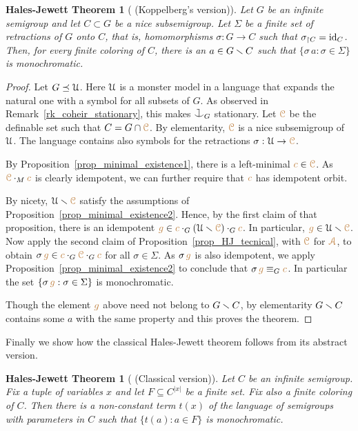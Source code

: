 \theoremstyle{mio}
\newtheorem{HalesJewett}[thm]{Hales-Jewett Theorem}
\begin{HalesJewett}[ (Koppelberg's version)]\label{thm_abstract_HJ}
Let $G$ be an infinite semigroup and let $C\subset G$ be a nice subsemigroup.
Let $\Sigma$ be a finite set of retractions of $G$ onto $C$, that is, 
homomorphisms $\sigma:G\to C$ such that $\sigma_{\restriction C}={\rm id}_C$.
Then, for every finite coloring of $C$,
there is an $a\in G\smallsetminus C$ such that $\{\sigma\,a:\sigma\in\Sigma\}$ is monochromatic.
\end{HalesJewett}

\begin{proof}
Let $G\preceq\EuScript U$.
Here $\EuScript U$ is a monster model in a language that expands the natural one with a symbol for all subsets of $G$.
As observed in Remark~\ref{rk_coheir_stationary}, 
this makes $\cnonfork_G$ stationary.
Let ${\color{brown}\EuScript C}$ be the definable set such that $C=G\cap{\color{brown}\EuScript C}$.
By elementarity, ${\color{brown}\EuScript C}$ is a nice subsemigroup of $\EuScript U$.
The language contains also symbols for 
the retractions $\sigma:\EuScript U\to{\color{brown}\EuScript C}$.

By Proposition~\ref{prop_minimal_existence1}, there is a left-minimal ${\color{brown} c}\in{\color{brown}\EuScript C}$.
As ${\color{brown}\EuScript C}\cdot_M{\color{brown} c}$ is clearly idempotent, we can further require that ${\color{brown} c}$ has idempotent orbit.

By nicety, $\EuScript U\smallsetminus{\color{brown}\EuScript C}$ satisfy the assumptions of 
Proposition~\ref{prop_minimal_existence2}.
%
Hence, by the first claim of that proposition, there is an idempotent
${\color{brown} g}\in{\color{brown}c}\cdot_G(\EuScript U\smallsetminus{\color{brown}\EuScript C})\cdot_G{\color{brown} c}$.
%
In particular, ${\color{brown} g}\in\EuScript U\smallsetminus{\color{brown}\EuScript C}$.
%
Now apply the second claim of Proposition~\ref{prop_HJ_tecnical},
with ${\color{brown}\EuScript C}$ for ${\color{brown}\EuScript A}$, to  obtain 
$\sigma\,{\color{brown} g}\in{\color{brown}c}\cdot_G{\color{brown}\EuScript C}\cdot_G{\color{brown} c}$ 
for all $\sigma\in\Sigma$.
%
As $\sigma\,{\color{brown} g}$ is also idempotent, we apply 
Proposition~\ref{prop_minimal_existence2} to conclude that 
$\sigma\,{\color{brown} g}\equiv_G{\color{brown} c}$.
%
In particular the set $\{\sigma\,{\color{brown} g}:\sigma\in\Sigma\}$ is monochromatic.

Though the element ${\color{brown} g}$ above need not belong to $G\smallsetminus C$,
by elementarity $G\smallsetminus C$ contains some $a$ with the same property and 
this proves the theorem.
\end{proof}

Finally we show how the classical Hales-Jewett theorem follows from its abstract version.

\begin{HalesJewett}[ (Classical version)]\label{thm_HalesJewett}
Let $C$ be an infinite semigroup.
Fix a tuple of variables $x$ and let $F\subseteq C^{|x|}$ be a finite set.
Fix also a finite coloring of $C$.
Then there is a non-constant term $t(x)$ 
of the language of semigroups with parameters in $C$
such that $\{ t(a): a\in F\}$ is monochromatic.
\end{HalesJewett}

